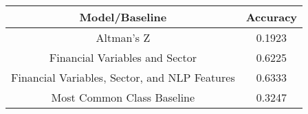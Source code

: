 \footnotesize
\begin{tabular}{cc}
\toprule
Model/Baseline & Accuracy \\
\midrule
Altman's Z & 0.1923 \\
Financial Variables and Sector & 0.6225 \\
Financial Variables, Sector, and NLP Features & 0.6333 \\
Most Common Class Baseline & 0.3247 \\
\bottomrule
\end{tabular}

\normalsize